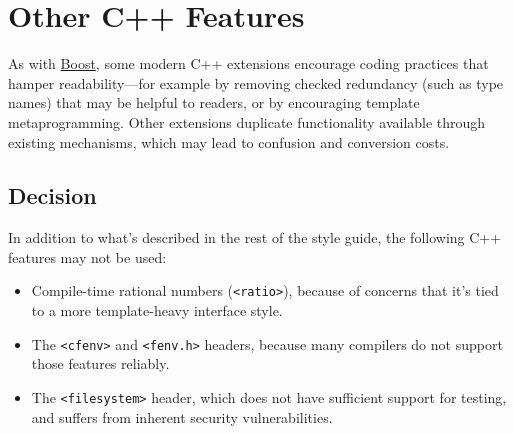 
\section{Other C++ Features}\label{sec:other-c++-features}
As with \hyperref[sec:boost]{Boost}, some modern C++ extensions encourage coding practices that hamper readability—for example by removing checked redundancy (such as type names) that may be helpful to readers, or by encouraging template metaprogramming. Other extensions duplicate functionality available through existing mechanisms, which may lead to confusion and conversion costs.

\subsection{Decision}
In addition to what's described in the rest of the style guide, the following C++ features may not be used:
\begin{itemize}
\item Compile-time rational numbers (\texttt{<ratio>}), because of concerns that it's tied to a more template-heavy interface style.
\item The \texttt{<cfenv>} and \texttt{<fenv.h>} headers, because many compilers do not support those features reliably.
\item The \texttt{<filesystem>} header, which does not have sufficient support for testing, and suffers from inherent security vulnerabilities.
\end{itemize}
